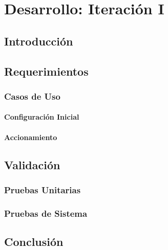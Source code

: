 
\chapter{Desarrollo: Iteración I} %

\label{Chapter6} %


\section{Introducción}
\section{Requerimientos}
\subsection{Casos de Uso}
\subsubsection{Configuración Inicial}
\subsubsection{Accionamiento}
\section{Validación}
\subsection{Pruebas Unitarias}
\subsection{Pruebas de Sistema}
\section{Conclusión}